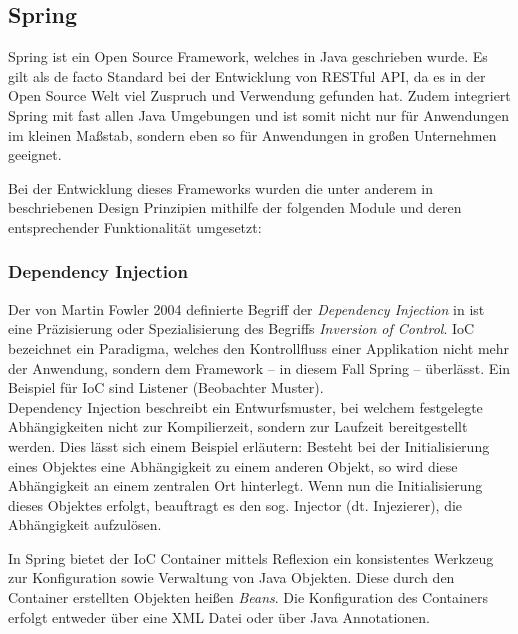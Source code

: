 		\subsection{Spring} %
		\label{sec:spring}
		
			Spring ist ein Open Source Framework, welches in Java geschrieben wurde. Es gilt als de facto Standard bei der Entwicklung von RESTful API, da es in der Open Source Welt viel Zuspruch und Verwendung gefunden hat. Zudem integriert Spring mit fast allen Java Umgebungen und ist somit nicht nur für Anwendungen im kleinen Maßstab, sondern eben so für Anwendungen in großen Unternehmen geeignet. \cite{Walls.20162017} 
			
			Bei der Entwicklung dieses Frameworks wurden die unter anderem in \cite{Johnson.2003} beschriebenen Design Prinzipien mithilfe der folgenden Module und deren entsprechender Funktionalität umgesetzt:
			
			\subsubsection{Dependency Injection} %
			
				Der von Martin Fowler 2004 definierte Begriff der \textit{Dependency Injection} in \cite{Fowler.23.01.2020} ist eine Präzisierung oder Spezialisierung des Begriffs \textit{Inversion of Control}. \acs{IoC} bezeichnet ein Paradigma, welches den Kontrollfluss einer Applikation nicht mehr der Anwendung, sondern dem Framework -- in diesem Fall Spring -- überlässt. Ein Beispiel für \acs{IoC} sind Listener (Beobachter Muster). \\
				Dependency Injection beschreibt ein Entwurfsmuster, bei welchem festgelegte Abhängigkeiten nicht zur Kompilierzeit, sondern zur Laufzeit bereitgestellt werden. Dies lässt sich einem Beispiel erläutern: Besteht bei der Initialisierung eines Objektes eine Abhängigkeit zu einem anderen Objekt, so wird diese Abhängigkeit an einem zentralen Ort hinterlegt. Wenn nun die Initialisierung dieses Objektes erfolgt, beauftragt es den sog. Injector (dt. Injezierer), die Abhängigkeit aufzulösen. \cite{Fowler.23.01.2020}
				
				In Spring bietet der \acs{IoC} Container mittels Reflexion ein konsistentes Werkzeug zur Konfiguration sowie Verwaltung von Java Objekten. Diese durch den Container erstellten Objekten heißen \textit{Beans}. Die Konfiguration des Containers erfolgt entweder über eine \acs{XML} Datei oder über Java Annotationen. \cite{Walls.20162017} 
				
